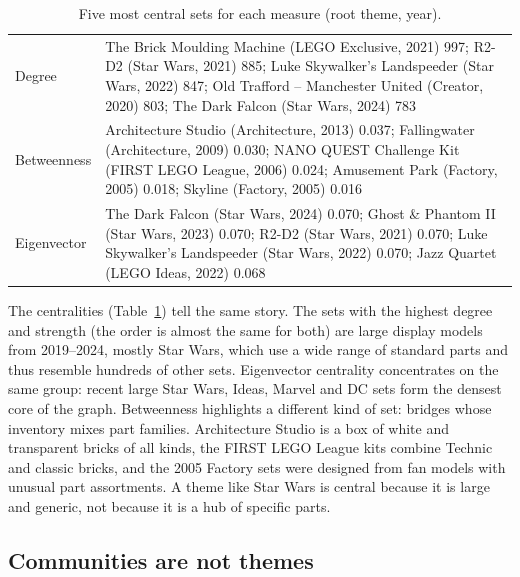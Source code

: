 \documentclass[10pt,a4paper]{article}
\begin{document}
\begin{table}[htbp]
  \centering
  \small
  \caption{Five most central sets for each measure (root theme, year).}
  \label{tab:centrality}
  \begin{tabular}{@{}l@{\ }p{}@{}}
    \toprule
    Degree &
    The Brick Moulding Machine (LEGO Exclusive, 2021) 997;
    R2-D2 (Star Wars, 2021) 885;
    Luke Skywalker's Landspeeder (Star Wars, 2022) 847;
    Old Trafford -- Manchester United (Creator, 2020) 803;
    The Dark Falcon (Star Wars, 2024) 783 \\
    \addlinespace
    Betweenness &
    Architecture Studio (Architecture, 2013) 0.037;
    Fallingwater (Architecture, 2009) 0.030;
    NANO QUEST Challenge Kit (FIRST LEGO League, 2006) 0.024;
    Amusement Park (Factory, 2005) 0.018;
    Skyline (Factory, 2005) 0.016 \\
    \addlinespace
    Eigenvector &
    The Dark Falcon (Star Wars, 2024) 0.070;
    Ghost \& Phantom II (Star Wars, 2023) 0.070;
    R2-D2 (Star Wars, 2021) 0.070;
    Luke Skywalker's Landspeeder (Star Wars, 2022) 0.070;
    Jazz Quartet (LEGO Ideas, 2022) 0.068 \\
    \bottomrule
  \end{tabular}
\end{table}

The centralities (Table~\ref{tab:centrality}) tell the same story. The sets
with the highest degree and strength (the order is almost the same for both)
are large display models from 2019--2024, mostly Star Wars, which use a wide
range of standard parts and thus resemble hundreds of other sets. Eigenvector
centrality concentrates on the same group: recent large Star Wars, Ideas,
Marvel and DC sets form the densest core of the graph. Betweenness highlights a
different kind of set: bridges whose inventory mixes part families. Architecture
Studio is a box of white and transparent bricks of all kinds, the FIRST LEGO
League kits combine Technic and classic bricks, and the 2005 Factory sets were
designed from fan models with unusual part assortments. A theme like Star Wars
is central because it is large and generic, not because it is a hub of
specific parts.

\subsection{Communities are not themes}
\end{document}
